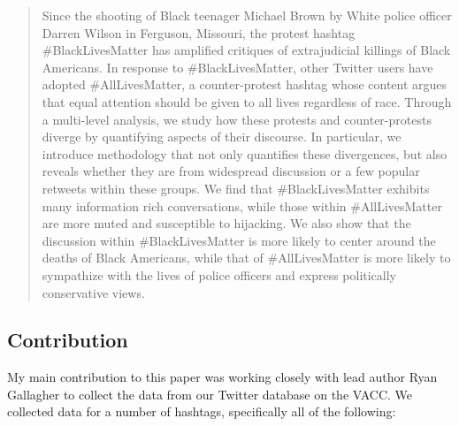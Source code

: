 \begin{quote}
  Since the shooting of Black teenager Michael Brown by White police officer Darren Wilson in Ferguson, Missouri,
the protest hashtag \#BlackLivesMatter has amplified critiques of extrajudicial killings of Black Americans.
In response to \#BlackLivesMatter,
other Twitter users have adopted \#AllLivesMatter,
a counter-protest hashtag whose content argues that equal attention should be given to all lives regardless of race.
Through a multi-level analysis,
we study how these protests and counter-protests diverge by quantifying aspects of their discourse.
In particular,
we introduce methodology that not only quantifies these divergences,
but also reveals whether they are from widespread discussion or a few popular retweets within these groups.
We find that \#BlackLivesMatter exhibits many information rich conversations,
while those within \#AllLivesMatter are more muted and susceptible to hijacking.
We also show that the discussion within \#BlackLivesMatter is more likely to center around the deaths of Black Americans,
while that of \#AllLivesMatter is more likely to sympathize with the lives of police officers and express politically conservative views.
\end{quote}

\subsection{Contribution}

My main contribution to this paper was working closely with lead author Ryan Gallagher to collect the data from our Twitter database on the VACC.
We collected data for a number of hashtags, specifically all of the following:


